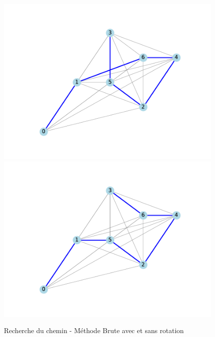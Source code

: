 \documentclass{article}
\begin{document}
\begin{figure}[h!]
	\centering
	\includegraphics[scale=0.4]{figs/best_path_arbitrary_slow_turning.pdf}
	\includegraphics[scale=0.4]{figs/best_path_arbitrary.pdf}
	\caption{Recherche du chemin - Méthode Brute avec et sans rotation}
	\label{tsp_turn_1}
\end{figure}
\end{document}
